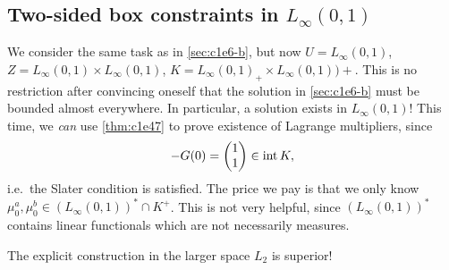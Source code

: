 \documentclass[../skript.tex]{subfiles}
\begin{document}
\subsection{Two-sided box constraints in \texorpdfstring{$L_\infty(0, 1)$}{L∞(0, 1)}} %
\label{sec:c1e6-c}
We consider the same task as in \cref{sec:c1e6-b}, but now $U = L_\infty(0, 1)$, $Z = L_\infty(0, 1) \times L_\infty(0, 1)$, $K = L_\infty(0, 1)_+ \times L_\infty(0, 1))+$.
This is no restriction after convincing oneself that the solution in \cref{sec:c1e6-b} must be bounded almost everywhere.
In particular, a solution exists in $L_\infty(0, 1)$!
This time, we \emph{can} use \cref{thm:c1e47} to prove existence of Lagrange multipliers, since
\[
	-G(0) = \begin{pmatrix}
	1 \\ 1
	\end{pmatrix} \in \operatorname{int} K,
\]
i.e.\ the Slater condition is satisfied.
The price we pay is that we only know $\mu_0^a, \mu_0^b \in (L_\infty(0, 1))^* \cap K^+$. This is not very helpful, since $(L_\infty(0, 1))^*$ contains linear functionals which are not necessarily measures.

The explicit construction in the larger space $L_2$ is superior!
\end{document}
